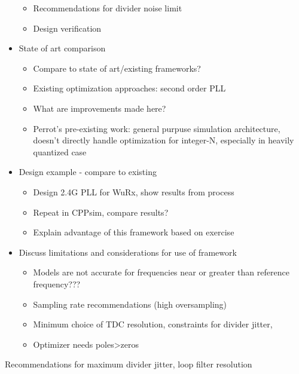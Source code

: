 \begin{itemize}
\begin{itemize}
		\item Recommendations for divider noise limit
		\item Design verification
	\end{itemize}
	\item State of art comparison
	\begin{itemize}
		\item Compare to state of art/existing frameworks?
		\item Existing optimization approaches: second order PLL \cite{spalvieri_2006}
		\item What are improvements made here?
		\item Perrot's pre-existing work: general purpuse simulation architecture, doesn't directly handle optimization for integer-N, especially in heavily quantized case
	\end{itemize}
	\item Design example - compare to existing
	\begin{itemize}
		\item Design 2.4G PLL for WuRx, show results from process
		\item Repeat in CPPsim, compare results?
		\item Explain advantage of this framework based on exercise
	\end{itemize}
	\item Discuss limitations and considerations for use of framework
	\begin{itemize}
		\item Models are not accurate for frequencies near or greater than reference frequency???
		\item Sampling rate recommendations (high oversampling)
		\item Minimum choice of TDC resolution, constraints for divider jitter,
		\item Optimizer needs poles>zeros
	\end{itemize}
\end{itemize}

	Recommendations for maximum divider jitter, loop filter resolution
